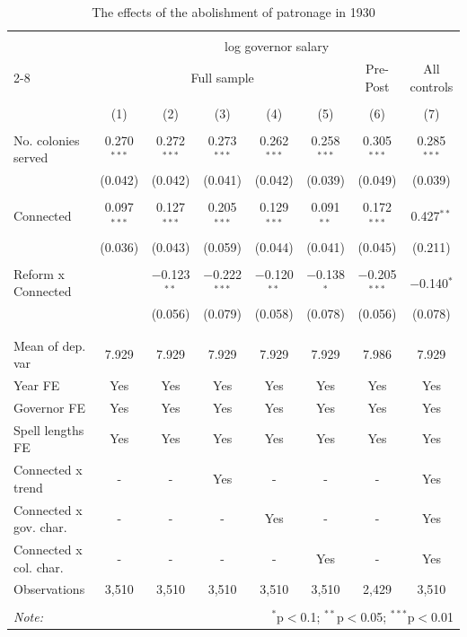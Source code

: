 \documentclass[a4paper]{article}\usepackage[]{graphicx}\usepackage[]{xcolor}
\begin{document}
\begin{table}[!htbp] \centering 
  \caption{The effects of the abolishment of patronage in 1930} 
  \label{tab:abol} 
\scriptsize 
\begin{tabular}{@{\extracolsep{5pt}}lccccccc} 
\\[-1.8ex]\hline 
\hline \\[-1.8ex] 
 & \multicolumn{7}{c}{log governor salary} \\ 
\cline{2-8} 
 & \multicolumn{5}{c}{Full sample} & Pre-Post & All controls \\ 
\\[-1.8ex] & (1) & (2) & (3) & (4) & (5) & (6) & (7)\\ 
\hline \\[-1.8ex] 
 No. colonies served & 0.270$^{***}$ & 0.272$^{***}$ & 0.273$^{***}$ & 0.262$^{***}$ & 0.258$^{***}$ & 0.305$^{***}$ & 0.285$^{***}$ \\ 
  & (0.042) & (0.042) & (0.041) & (0.042) & (0.039) & (0.049) & (0.039) \\ 
  & & & & & & & \\ 
 Connected & 0.097$^{***}$ & 0.127$^{***}$ & 0.205$^{***}$ & 0.129$^{***}$ & 0.091$^{**}$ & 0.172$^{***}$ & 0.427$^{**}$ \\ 
  & (0.036) & (0.043) & (0.059) & (0.044) & (0.041) & (0.045) & (0.211) \\ 
  & & & & & & & \\ 
 Reform x Connected &  & $-$0.123$^{**}$ & $-$0.222$^{***}$ & $-$0.120$^{**}$ & $-$0.138$^{*}$ & $-$0.205$^{***}$ & $-$0.140$^{*}$ \\ 
  &  & (0.056) & (0.079) & (0.058) & (0.078) & (0.056) & (0.078) \\ 
  & & & & & & & \\ 
\hline \\[-1.8ex] 
Mean of dep. var & 7.929 & 7.929 & 7.929 & 7.929 & 7.929 & 7.986 & 7.929 \\ 
Year FE & Yes & Yes & Yes & Yes & Yes & Yes & Yes \\ 
Governor FE & Yes & Yes & Yes & Yes & Yes & Yes & Yes \\ 
Spell lengths FE & Yes & Yes & Yes & Yes & Yes & Yes & Yes \\ 
Connected x trend & - & - & Yes & - & - & - & Yes \\ 
Connected x gov. char. & - & - & - & Yes & - & - & Yes \\ 
Connected x col. char. & - & - & - & - & Yes & - & Yes \\ 
Observations & 3,510 & 3,510 & 3,510 & 3,510 & 3,510 & 2,429 & 3,510 \\ 
\hline 
\hline \\[-1.8ex] 
\textit{Note:}  & \multicolumn{7}{r}{$^{*}$p$<$0.1; $^{**}$p$<$0.05; $^{***}$p$<$0.01} \\ 
\end{tabular} 
\end{table} 
\end{document}
